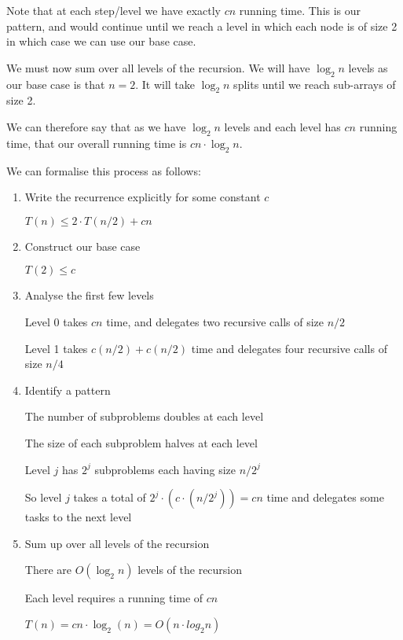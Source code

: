 \documentclass{article}
\begin{document}
Note that at each step/level we have exactly $cn$ running time. This is our pattern, and would continue until we reach a level in which each node is of size 2 in which case we can use our base case.

We must now sum over all levels of the recursion. We will have $\log_{2}n$ levels as our base case is that $n=2$. It will take $\log_{2} n$ splits until we reach sub-arrays of size 2.

We can therefore say that as we have $\log_{2} n$ levels and each level has $cn$ running time, that our overall running time is $cn \cdot \log_{2} n$.

We can formalise this process as follows:

\begin{enumerate}
  \item Write the recurrence explicitly for some constant $c$

        $T(n) \leq 2 \cdot T(n/2) + cn$
  \item Construct our base case

        $T(2) \leq c$

  \item Analyse the first few levels

        Level 0 takes $cn$ time, and delegates two recursive calls of size $n/2$

        Level 1 takes $c(n/2) + c(n/2)$ time and delegates four recursive calls of size $n/4$

  \item Identify a pattern

        The number of subproblems doubles at each level

        The size of each subproblem halves at each level

        Level $j$ has $2^{j}$ subproblems each having size $n/2^{j}$

        So level $j$ takes a total of $2^{j}\cdot (c\cdot (n/2^{j})) = cn$ time and delegates some tasks to the next level

  \item Sum up over all levels of the recursion

        There are $O(\log_{2}n)$ levels of the recursion

        Each level requires a running time of $cn$

        $T(n) = cn\cdot \log_{2}(n) = O(n\cdot
        log_{2}n)$
\end{enumerate}
\end{document}
